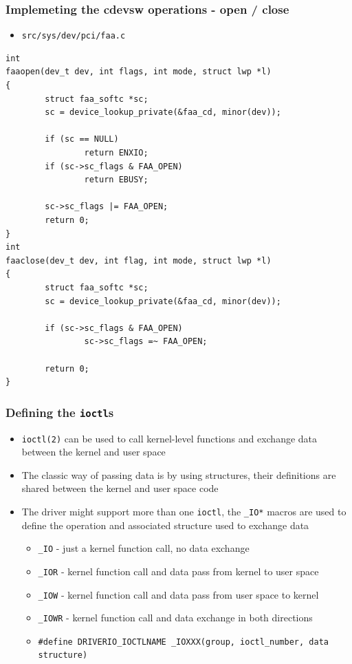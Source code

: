\documentclass[dvipsnames,table]{beamer}
\begin{document}
\begin{frame}[fragile]
\frametitle{Implemeting the cdevsw operations - open / close}
\begin{itemize}
	\item {\tt src/sys/dev/pci/faa.c}
\end{itemize}
\begin{lstlisting}
int
faaopen(dev_t dev, int flags, int mode, struct lwp *l)
{
        struct faa_softc *sc;
        sc = device_lookup_private(&faa_cd, minor(dev));

        if (sc == NULL)
                return ENXIO;
        if (sc->sc_flags & FAA_OPEN)
                return EBUSY;

        sc->sc_flags |= FAA_OPEN;
        return 0;
}
int
faaclose(dev_t dev, int flag, int mode, struct lwp *l)
{
        struct faa_softc *sc;
        sc = device_lookup_private(&faa_cd, minor(dev));

        if (sc->sc_flags & FAA_OPEN)
                sc->sc_flags =~ FAA_OPEN;

        return 0;
}
\end{lstlisting}
\end{frame}

\begin{frame}
\frametitle{Defining the {\tt ioctl}s}
\begin{itemize}
	\item {\tt ioctl(2)} can be used to call kernel-level functions and exchange data between the kernel and user space
	\item The classic way of passing data is by using structures, their definitions are shared between the kernel and user space code
	\item The driver might support more than one {\tt ioctl}, the {\tt \_IO*} macros are used to define the operation and associated structure used to exchange data
	\begin{itemize}
		\item {\tt \_IO} - just a kernel function call, no data exchange
		\item {\tt \_IOR} - kernel function call and data pass from kernel to user space
		\item {\tt \_IOW} - kernel function call and data pass from user space to kernel
		\item {\tt \_IOWR} - kernel function call and data exchange in both directions
		\item {\tt \#define DRIVERIO\_IOCTLNAME	\_IOXXX(group, ioctl\_number, data structure)}
	\end{itemize}
\end{itemize}

\end{frame}
\end{document}
